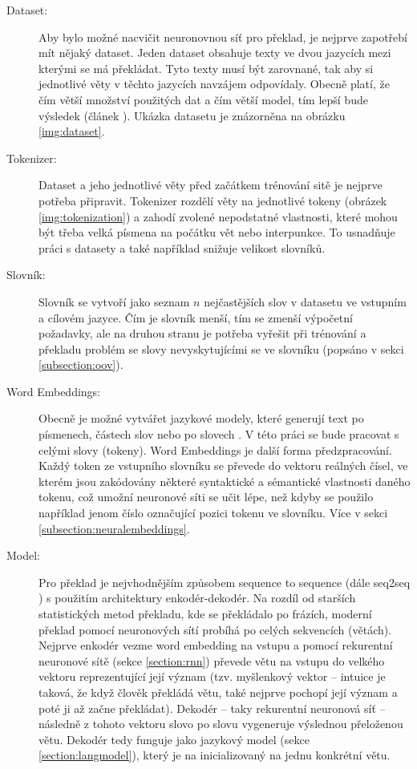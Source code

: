 \begin{description}
  \item[Dataset:] Aby bylo možné nacvičit neuronovnou síť pro překlad, je nejprve zapotřebí mít nějaký dataset. Jeden dataset obsahuje texty ve dvou jazycích mezi kterými se má překládat. Tyto texty musí být zarovnané, tak aby si jednotlivé věty v těchto jazycích navzájem odpovídaly. Obecně platí, že čím větší množství použitých dat a čím větší model, tím lepší bude výsledek (článek \cite{googleLimits}). Ukázka datasetu je znázorněna na obrázku \ref{img:dataset}.

  \item[Tokenizer:] Dataset a jeho jednotlivé věty před začátkem trénování sitě je nejprve potřeba připravit. Tokenizer rozdělí věty na jednotlivé tokeny (obrázek \ref{img:tokenization}) a zahodí zvolené nepodstatné vlastnosti, které mohou být třeba velká písmena na počátku vět nebo interpunkce. To usnadňuje práci s datasety a také například snižuje velikost slovníků.

  \item[Slovník:] Slovník se vytvoří jako seznam $n$ nejčastějších slov v datasetu ve vstupním a cílovém jazyce. Čím je slovník menší, tím se zmenší výpočetní požadavky, ale na druhou stranu je potřeba vyřešit při trénování a překladu problém se slovy nevyskytujícími se ve slovníku (popsáno v sekci \ref{subsection:oov}).

  \item[Word Embeddings:] Obecně je možné vytvářet jazykové modely, které generují text po písmenech, částech slov nebo po slovech \cite{mikolovSubwords}. V této práci se bude pracovat s celými slovy (tokeny). Word Embeddings je další forma předzpracování. Každý token ze vstupního slovníku se převede do vektoru reálných čísel, ve kterém jsou zakódovány některé syntaktické a sémantické vlastnosti daného tokenu, což umožní neuronové síti se učit lépe, než kdyby se použilo například jenom číslo označující pozici tokenu ve slovníku. Více v sekci \ref{subsection:neuralembeddings}.

  \item[Model:] Pro překlad je nejvhodnějším způsobem sequence to sequence (dále seq2seq \cite{seq2seq}) s použitím architektury enkodér-dekodér. Na rozdíl od starších statistických metod překladu, kde se překládalo po frázích, moderní překlad pomocí neuronových sítí probíhá po celých sekvencích (větách). Nejprve enkodér vezme word embedding na vstupu a pomocí rekurentní neuronové sítě (sekce \ref{section:rnn}) převede větu na vstupu do velkého vektoru reprezentující její význam (tzv. myšlenkový vektor -- intuice je taková, že když člověk překládá větu, také nejprve pochopí její význam a poté ji až začne překládat). Dekodér -- taky rekurentní neuronová síť -- následně z tohoto vektoru slovo po slovu vygeneruje výslednou přeloženou větu. Dekodér tedy funguje jako jazykový model (sekce \ref{section:langmodel}), který je na inicializovaný na jednu konkrétní větu.
\end{description}


